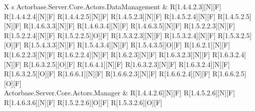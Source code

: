 \begin{longtable}{X s}
	\hline
	Actorbase.Server.Core.Actors.DataManagement & R[1.4.4.2.3][N][F] \newline R[1.4.4.2.4][N][F] \newline
		R[1.4.4.2.5][N][F] \newline R[1.4.5.2.3][N][F] \newline R[1.4.5.2.4][N][F] \newline
		R[1.4.5.2.5][N][F] \newline R[1.4.6.3.3][N][F] \newline R[1.4.6.3.4][N][F] \newline
		R[1.4.6.3.5][N][F] \newline R[1.5.2.2.3][N][F] \newline R[1.5.2.2.4][N][F] \newline
		R[1.5.2.2.5][O][F] \newline R[1.5.3.2.3][N][F] \newline R[1.5.3.2.4][N][F] \newline
		R[1.5.3.2.5][O][F] \newline R[1.5.4.3.3][N][F] \newline R[1.5.4.3.4][N][F] \newline
		R[1.5.4.3.5][O][F] \newline R[1.6.2.1][N][F] \newline R[1.6.2.2.3][N][F] \newline
		R[1.6.2.2.4][N][F] \newline R[1.6.2.3][N][F] \newline R[1.6.3.2.3][N][F] \newline
		R[1.6.3.2.4][N][F] \newline R[1.6.3.2.5][O][F] \newline R[1.6.4.1][N][F] \newline
		R[1.6.3.2.3][N][F] \newline R[1.6.3.2.4][N][F] \newline R[1.6.3.2.5][O][F] \newline
		R[1.6.6.1][N][F] \newline R[1.6.6.2.3][N][F] \newline R[1.6.6.2.4][N][F] \newline
		R[1.6.6.2.5][O][F]
	\\
	\hline
	Actorbase.Server.Core.Actors.Manager & R[1.4.4.2.6][N][F] \newline R[1.4.5.2.6][N][F] \newline 
		R[1.4.6.3.6][N][F] \newline R[1.5.2.2.6][O][F] \newline R[1.5.3.2.6][O][F] \newline

\end{longtable}

